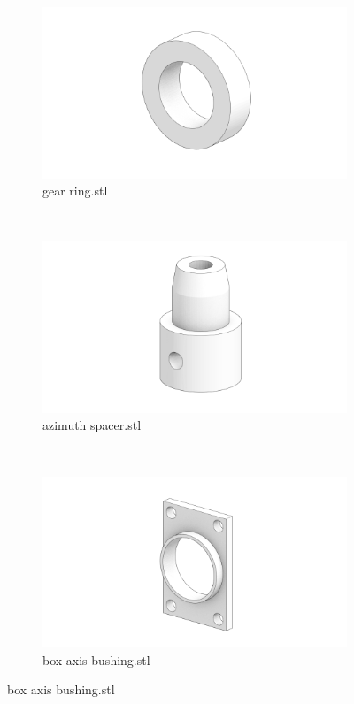 \documentclass[a4paper]{article}
\begin{document}
\vspace{0.5cm}

\begin{figure}
        \centering
        \begin{subfigure}[b]{0.3\textwidth}
                \includegraphics[width=\textwidth]{figures/gear_ring.png}
                \caption*{gear ring.stl }
        \end{subfigure}
        ~ 
        \begin{subfigure}[b]{0.3\textwidth}
                \includegraphics[width=\textwidth]{figures/azimuth_spacer.png}
                \caption*{azimuth spacer.stl }
        \end{subfigure}
        ~ 
        \begin{subfigure}[b]{0.3\textwidth}
                \includegraphics[width=\textwidth]{figures/box_axis_bushing.png}
                \caption*{box axis bushing.stl }
        \end{subfigure}
\end{figure}
\end{document}
